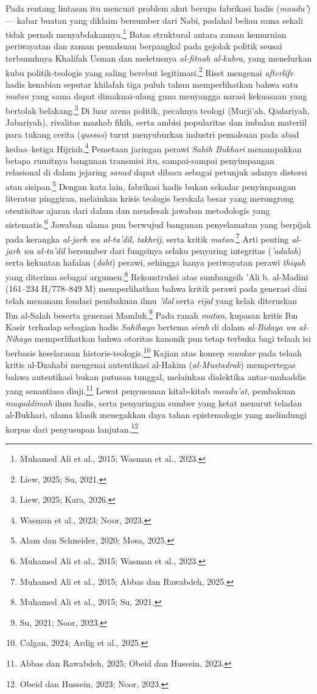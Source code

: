 Pada rentang lintasan itu mencuat problem akut berupa fabrikasi hadis (\textit{maudu'}) --- kabar buatan yang diklaim bersumber dari Nabi, padahal beliau sama sekali tidak pernah menyabdakannya.\footnote{Muhamed Ali et al., 2015; Wasman et al., 2023.} Batas struktural antara zaman kemurnian periwayatan dan zaman pemalsuan berpangkal pada gejolak politik seusai terbunuhnya Khalifah Usman dan meletusnya \textit{al-fitnah al-kubra}, yang menelurkan kubu politik-teologis yang saling berebut legitimasi.\footnote{Liew, 2025; Su, 2021.} Riset mengenai \textit{afterlife} hadis kenabian seputar khilafah tiga puluh tahun memperlihatkan bahwa satu \textit{matan} yang sama dapat dimaknai-ulang guna menyangga narasi kekuasaan yang bertolak belakang.\footnote{Liew, 2025; Kara, 2026.} Di luar arena politik, pecahnya teologi (Murji'ah, Qadariyah, Jabariyah), rivalitas mazhab fikih, serta ambisi popularitas dan imbalan materiil para tukang cerita (\textit{qussas}) turut menyuburkan industri pemalsuan pada abad kedua--ketiga Hijriah.\footnote{Wasman et al., 2023; Noor, 2023.} Pemetaan jaringan perawi \textit{Sahih Bukhari} menampakkan betapa rumitnya bangunan transmisi itu, sampai-sampai penyimpangan relasional di dalam jejaring \textit{sanad} dapat dibaca sebagai petunjuk adanya distorsi atau sisipan.\footnote{Alam dan Schneider, 2020; Mosa, 2025.} Dengan kata lain, fabrikasi hadis bukan sekadar penyimpangan literatur pinggiran, melainkan krisis teologis berskala besar yang merongrong otentisitas ajaran dari dalam dan mendesak jawaban metodologis yang sistematis.\footnote{Muhamed Ali et al., 2015; Wasman et al., 2023.} Jawaban ulama pun berwujud bangunan penyelamatan yang berpijak pada kerangka \textit{al-jarh wa al-ta'dil}, \textit{takhrij}, serta kritik \textit{matan}.\footnote{Muhamed Ali et al., 2015; Abbas dan Rawabdeh, 2025.} Arti penting \textit{al-jarh wa al-ta'dil} bersumber dari fungsinya selaku penyaring integritas (\textit{'adalah}) serta kekuatan hafalan (\textit{dabt}) perawi, sehingga hanya periwayatan perawi \textit{thiqah} yang diterima sebagai argumen.\footnote{Muhamed Ali et al., 2015; Su, 2021.} Rekonstruksi atas sumbangsih 'Ali b. al-Madini (161--234 H/778--849 M) memperlihatkan bahwa kritik perawi pada generasi dini telah menanam fondasi pembakuan ilmu \textit{'ilal} serta \textit{rijal} yang kelak diteruskan Ibn al-Salah beserta generasi Mamluk.\footnote{Su, 2021; Noor, 2023.} Pada ranah \textit{matan}, kupasan kritis Ibn Kasir terhadap sebagian hadis \textit{Sahihayn} bertema \textit{sirah} di dalam \textit{al-Bidaya wa al-Nihaya} memperlihatkan bahwa otoritas kanonik pun tetap terbuka bagi telaah isi berbasis keselarasan historis-teologis.\footnote{Calgan, 2024; Ardig et al., 2025.} Kajian atas konsep \textit{munkar} pada telaah kritis al-Dzahabi mengenai autentikasi al-Hakim (\textit{al-Mustadrak}) mempertegas bahwa autentikasi bukan putusan tunggal, melainkan dialektika antar-muhaddis yang senantiasa diuji.\footnote{Abbas dan Rawabdeh, 2025; Obeid dan Hussein, 2023.} Lewat penyusunan kitab-kitab \textit{maudu'at}, pembakuan \textit{muqaddimah} ilmu hadis, serta penyaringan sumber yang ketat menurut teladan al-Bukhari, ulama klasik menegakkan daya tahan epistemologis yang melindungi korpus dari penyusupan lanjutan.\footnote{Obeid dan Hussein, 2023; Noor, 2023.}

